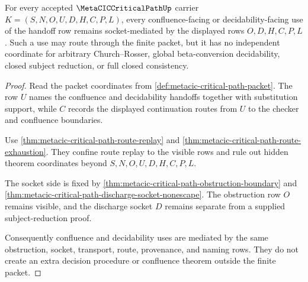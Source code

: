 \begin{theorem}
\label{thm:metacic-critical-path-confluence-decidability-socket}
For every accepted $\MetaCICCriticalPathUp$ carrier $K=(S,N,O,U,D,H,C,P,L)$, every confluence-facing or decidability-facing use of the handoff row remains socket-mediated by the displayed rows $O,D,H,C,P,L$. Such a use may route through the finite packet, but it has no independent coordinate for arbitrary Church--Rosser, global beta-conversion decidability, closed subject reduction, or full closed consistency.
\end{theorem}
\begin{proof}
Read the packet coordinates from \autoref{def:metacic-critical-path-packet}. The row $U$ names the confluence and decidability handoffs together with substitution support, while $C$ records the displayed continuation routes from $U$ to the checker and confluence boundaries.

Use \autoref{thm:metacic-critical-path-route-replay} and \autoref{thm:metacic-critical-path-route-exhaustion}. They confine route replay to the visible rows and rule out hidden theorem coordinates beyond $S,N,O,U,D,H,C,P,L$.

The socket side is fixed by \autoref{thm:metacic-critical-path-obstruction-boundary} and \autoref{thm:metacic-critical-path-discharge-socket-nonescape}. The obstruction row $O$ remains visible, and the discharge socket $D$ remains separate from a supplied subject-reduction proof.

Consequently confluence and decidability uses are mediated by the same obstruction, socket, transport, route, provenance, and naming rows. They do not create an extra decision procedure or confluence theorem outside the finite packet.
\end{proof}

